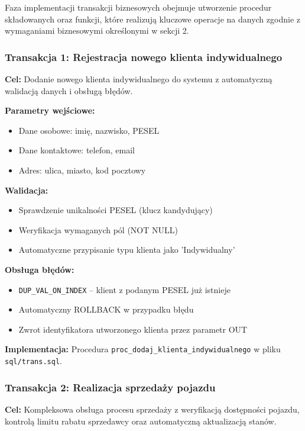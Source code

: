 \documentclass[a4paper,titleauthor]{mwart}
\begin{document}
	Faza implementacji transakcji biznesowych obejmuje utworzenie procedur składowanych oraz funkcji, które realizują kluczowe operacje na danych zgodnie z wymaganiami biznesowymi określonymi w sekcji 2.

	\subsubsection{Transakcja 1: Rejestracja nowego klienta indywidualnego}

	\textbf{Cel:} Dodanie nowego klienta indywidualnego do systemu z automatyczną walidacją danych i obsługą błędów.

	\textbf{Parametry wejściowe:}
	\begin{itemize}
		\item Dane osobowe: imię, nazwisko, PESEL
		\item Dane kontaktowe: telefon, email
		\item Adres: ulica, miasto, kod pocztowy
	\end{itemize}

	\textbf{Walidacja:}
	\begin{itemize}
		\item Sprawdzenie unikalności PESEL (klucz kandydujący)
		\item Weryfikacja wymaganych pól (NOT NULL)
		\item Automatyczne przypisanie typu klienta jako 'Indywidualny'
	\end{itemize}

	\textbf{Obsługa błędów:}
	\begin{itemize}
		\item \texttt{DUP\_VAL\_ON\_INDEX} -- klient z podanym PESEL już istnieje
		\item Automatyczny ROLLBACK w przypadku błędu
		\item Zwrot identyfikatora utworzonego klienta przez parametr OUT
	\end{itemize}

	\textbf{Implementacja:} Procedura \texttt{proc\_dodaj\_klienta\_indywidualnego} w pliku \texttt{sql/trans.sql}.

	\subsubsection{Transakcja 2: Realizacja sprzedaży pojazdu}

	\textbf{Cel:} Kompleksowa obsługa procesu sprzedaży z weryfikacją dostępności pojazdu, kontrolą limitu rabatu sprzedawcy oraz automatyczną aktualizacją stanów.
\end{document}
